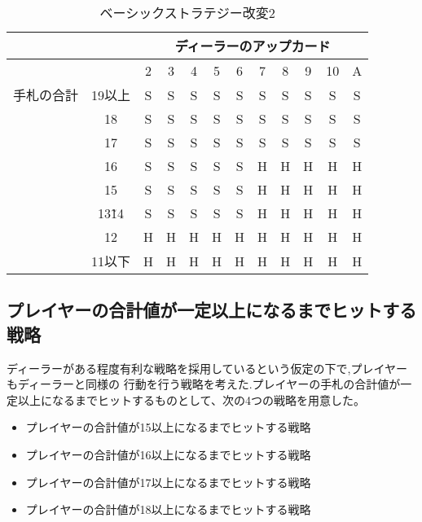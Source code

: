 \begin{table}[htbp]
  \centering
  \caption{ベーシックストラテジー改変2\label{bschange2}}
  \begin{tabular}{|c|c|c|c|c|c|c|c|c|c|c|c|}
    \hline
    \multicolumn{2}{|c|}{} & \multicolumn{10}{|c|}{ディーラーのアップカード} \\ \hline
    \multicolumn{2}{|c|}{} & 2 & 3 & 4 & 5 & 6 & 7 & 8 & 9 & 10 & A \\ \hline
    手札の合計 & 19以上 & S & S & S & S & S & S & S & S & S & S \\ \cline{3-12}
              & 18 & S & S & S & S & S & S & S & S & S & S \\ \cline{3-12}
              & 17 & S & S & S & S & S & S & S & S & S & S \\ \cline{3-12}
              & 16 & S & S & S & S & S & H & H & H & H & H \\ \cline{3-12}
              & 15 & S & S & S & S & S & H & H & H & H & H \\ \cline{3-12}
              & 13\~ 14 & S & S & S & S & S & H & H & H & H & H \\ \cline{3-12}
              & 12 & H & H & H & H & H & H & H & H & H & H \\ \cline{3-12}
              & 11以下 & H & H & H & H & H & H & H & H & H & H \\ \hline
  \end{tabular}
\end{table}

\subsection{プレイヤーの合計値が一定以上になるまでヒットする戦略}
ディーラーがある程度有利な戦略を採用しているという仮定の下で,プレイヤーもディーラーと同様の
行動を行う戦略を考えた.プレイヤーの手札の合計値が一定以上になるまでヒットするものとして、次の4つの戦略を用意した。
\begin{itemize}
  \item プレイヤーの合計値が15以上になるまでヒットする戦略
  \item プレイヤーの合計値が16以上になるまでヒットする戦略
  \item プレイヤーの合計値が17以上になるまでヒットする戦略
  \item プレイヤーの合計値が18以上になるまでヒットする戦略
\end{itemize}

